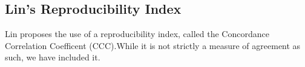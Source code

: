 \documentclass[MAIN.tex]{subfiles}
\begin{document}
\subsection{Lin's Reproducibility Index} Lin proposes the use of a reproducibility index, called the Concordance Correlation Coefficent (CCC).While it is not strictly a measure of agreement as such, we have included it.




\end{document}
